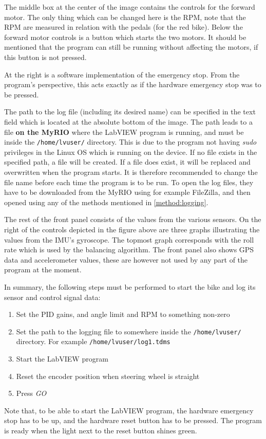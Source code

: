 The middle box at the center of the image contains the controls for the forward motor. The only thing which can be changed here is the RPM, note that the RPM are measured in relation with the pedals (for the red bike). Below the forward motor controls is a button which starts the two motors. It should be mentioned that the program can still be running without affecting the motors, if this button is not pressed.

At the right is a software implementation of the emergency stop. From the program's perspective, this acts exactly as if the hardware emergency stop was to be pressed.

The path to the log file (including its desired name) can be specified in the text field which is located at the absolute bottom of the image. The path leads to a file \textbf{on the MyRIO} where the LabVIEW program is running, and must be inside the \texttt{/home/lvuser/} directory. This is due to the program not having \textit{sudo} privileges in the Linux OS which is running on the device. If no file exists in the specified path, a file will be created. If a file does exist, it will be replaced and overwritten when the program starts. It is therefore recommended to change the file name before each time the program is to be run. To open the log files, they have to be downloaded from the MyRIO using for example FileZilla, and then opened using any of the methods mentioned in \ref{method:logging}.

The rest of the front panel consists of the values from the various sensors. On the right of the controls depicted in the figure above are three graphs illustrating the values from the IMU's gyroscope. The topmost graph corresponds with the roll rate which is used by the balancing algorithm. The front panel also shows GPS data and accelerometer values, these are however not used by any part of the program at the moment.

In summary, the following steps must be performed to start the bike and log its sensor and control signal data:
\begin{enumerate}
    \item Set the PID gains, and angle limit and RPM to something non-zero
    \item Set the path to the logging file to somewhere inside the \texttt{/home/lvuser/} directory. For example \texttt{/home/lvuser/log1.tdms}
    \item Start the LabVIEW program
    \item Reset the encoder position when steering wheel is straight
    \item Press \textit{GO}
\end{enumerate}

Note that, to be able to start the LabVIEW program, the hardware emergency stop has to be up, and the hardware reset button has to be pressed. The program is ready when the light next to the reset button shines green.